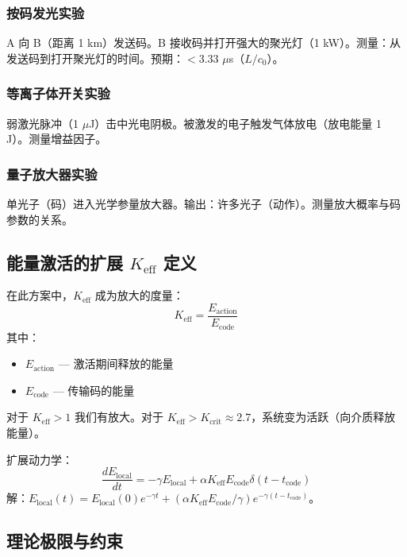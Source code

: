 \documentclass[11pt,a4paper]{article}
\begin{document}
	\subsubsection{按码发光实验}
	A 向 B（距离 1 km）发送码。B 接收码并打开强大的聚光灯（1 kW）。测量：从发送码到打开聚光灯的时间。预期：$< 3.33$ $\mu$s（$L/c_0$）。
	
	\subsubsection{等离子体开关实验}
	弱激光脉冲（1 $\mu$J）击中光电阴极。被激发的电子触发气体放电（放电能量 1 J）。测量增益因子。
	
	\subsubsection{量子放大器实验}
	单光子（码）进入光学参量放大器。输出：许多光子（动作）。测量放大概率与码参数的关系。
	
	\subsection{能量激活的扩展 $K_{\mathrm{eff}}$ 定义}
	
	在此方案中，$K_{\mathrm{eff}}$ 成为放大的度量：
	\begin{equation}
		K_{\mathrm{eff}} = \frac{E_{\text{action}}}{E_{\text{code}}}
	\end{equation}
	其中：
	\begin{itemize}
		\item $E_{\text{action}}$ — 激活期间释放的能量
		\item $E_{\text{code}}$ — 传输码的能量
	\end{itemize}
	
	对于 $K_{\mathrm{eff}} > 1$ 我们有放大。对于 $K_{\mathrm{eff}} > K_{\text{crit}} \approx 2.7$，系统变为活跃（向介质释放能量）。
	
	扩展动力学：
	\begin{equation}
		\frac{dE_{\text{local}}}{dt} = -\gamma E_{\text{local}} + \alpha K_{\mathrm{eff}} E_{\text{code}} \delta(t - t_{\text{code}})
	\end{equation}
	解：$E_{\text{local}}(t) = E_{\text{local}}(0) e^{-\gamma t} + (\alpha K_{\mathrm{eff}} E_{\text{code}}/\gamma) e^{-\gamma(t-t_{\text{code}})}$。
	
	\subsection{理论极限与约束}
	
\end{document}
